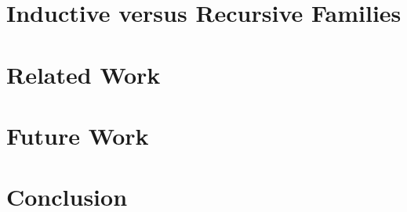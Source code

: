 \documentclass[12pt]{report}
\theoremstyle{definition}
\theoremstyle{remark}
\numberwithin{definition}{section}
\numberwithin{equation}{section}
\numberwithin{proposition}{section}
\numberwithin{conjecture}{section}
\numberwithin{theorem}{section}
\numberwithin{lemma}{section}
\numberwithin{corollary}{section}
\numberwithin{example}{section}
\numberwithin{remark}{section}
\begin{document}
\chapter{Inductive versus Recursive Families}\label{ch:ivsr}
\chapter{Related Work}\label{ch:related}
\chapter{Future Work}\label{ch:future}
\chapter{Conclusion}\label{ch:conc}




\end{document}
